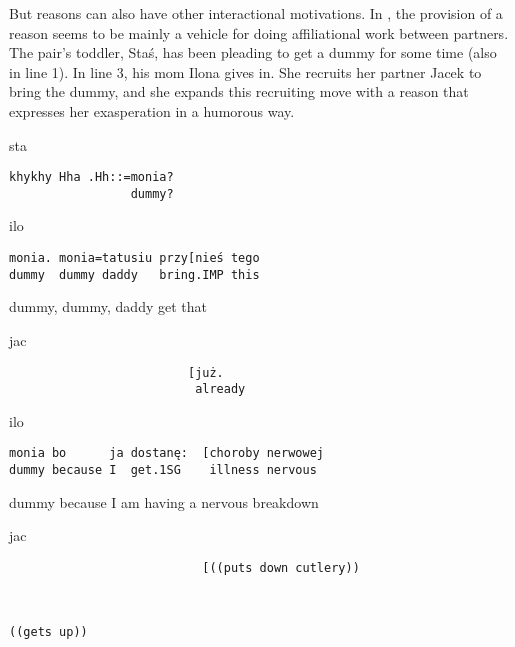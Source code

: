 \documentclass[output=paper]{langsci/langscibook}
\begin{document}
But reasons can also have other interactional motivations.  In , the provision of a reason seems to be mainly a vehicle for doing affiliational work between partners. The pair’s toddler, Staś, has been pleading to get a dummy for some time (also in line 1).  In line 3, his mom Ilona gives in.  She recruits her partner Jacek to bring the dummy, and she expands this recruiting move with a reason that expresses her exasperation in a humorous way.

\vspace{2mm}
%
\begin{transbox}{1}{sta}
\begin{verbatim}
khykhy Hha .Hh::=monia?
                 dummy?
\end{verbatim}
\end{transbox}
%
%
\begin{mdframednoverticalspace}[style=firstfoc]
\begin{transbox}{3}{ilo}
\begin{verbatim}
monia. monia=tatusiu przy[nieś tego
dummy  dummy daddy   bring.IMP this
\end{verbatim}
dummy, dummy, daddy get that
\end{transbox}
\end{mdframednoverticalspace}
%
\begin{mdframednoverticalspace}[style=secondfoc]
\begin{transbox}{4}{jac}
\begin{verbatim}
                         [już.
                          already
\end{verbatim}
\end{transbox}
\end{mdframednoverticalspace}
%
\begin{mdframednoverticalspace}[style=firstfoc]
\begin{transbox}{5}{ilo}
\begin{verbatim}
monia bo      ja dostanę:  [choroby nerwowej
dummy because I  get.1SG    illness nervous
\end{verbatim}
dummy because I am having a nervous breakdown
\end{transbox}
\end{mdframednoverticalspace}
%
\begin{mdframednoverticalspace}[style=secondfoc]
\begin{transbox}{6}{jac}
\begin{verbatim}
                           [((puts down cutlery))
\end{verbatim}
\end{transbox}
\end{mdframednoverticalspace}\vspace{-1mm}
%
\begin{mdframednoverticalspace}[style=secondfoc]
\begin{transbox}{7}{~}
\begin{verbatim}
((gets up))
\end{verbatim}
\end{transbox}
\end{mdframednoverticalspace}
\end{document}
